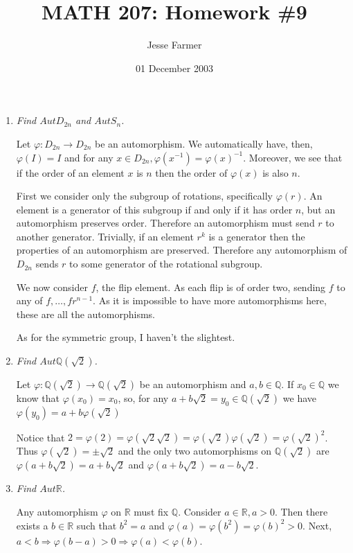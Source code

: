 \documentclass[10pt]{article}
\title{MATH 207: Homework \#9}
\author{Jesse Farmer}
\date{01 December 2003}
\begin{document}
\maketitle
\begin{enumerate}
\item \emph{Find $Aut D_{2n}$ and $Aut S_n$.}

Let $\varphi: D_{2n} \rightarrow D_{2n}$ be an automorphism.  We automatically have, then, $\varphi(I)=I$ and for any $x \in D_{2n},\varphi(x^{-1})=\varphi(x)^{-1}$.  Moreover, we see that if the order of an element $x$ is $n$ then the order of $\varphi(x)$ is also $n$.

First we consider only the subgroup of rotations, specifically $\varphi(r)$.  An element is a generator of this subgroup if and only if it has order $n$, but an automorphism preserves order.  Therefore an automorphism must send $r$ to another generator.  Trivially, if an element $r^k$ is a generator then the properties of an automorphism are preserved.  Therefore any automorphism of $D_{2n}$ sends $r$ to some generator of the rotational subgroup.

We now consider $f$, the flip element.  As each flip is of order two, sending $f$ to any of $f,\ldots,fr^{n-1}$.  As it is impossible to have more automorphisms here, these are all the automorphisms.

As for the symmetric group, I haven't the slightest.

\item \emph{Find $Aut{\mathbb{Q}(\sqrt{2})}$.}

Let $\varphi: \mathbb{Q}(\sqrt{2}) \rightarrow \mathbb{Q}(\sqrt{2})$ be an automorphism and $a,b \in \mathbb{Q}$.  If $x_0 \in \mathbb{Q}$ we know that $\varphi(x_0) = x_0$, so, for any $a + b\sqrt{2} = y_0 \in \mathbb{Q}(\sqrt{2})$ we have $\varphi(y_0) = a + b\varphi(\sqrt{2})$

Notice that $2 = \varphi(2) = \varphi(\sqrt{2}\sqrt{2}) = \varphi(\sqrt{2})\varphi(\sqrt{2}) = \varphi(\sqrt{2})^2$.  Thus $\varphi(\sqrt{2}) = \pm \sqrt{2}$ and the only two automorphisms on $\mathbb{Q}(\sqrt{2})$ are $\varphi(a+b\sqrt{2}) = a+b\sqrt{2}$ and $\varphi(a+b\sqrt{2}) = a-b\sqrt{2}$.
\item \emph{Find $Aut{\mathbb{R}}$.}

Any automorphism $\varphi$ on $\mathbb{R}$ must fix $\mathbb{Q}$.  Consider $a \in \mathbb{R}, a > 0$.  Then there exists a $b \in \mathbb{R}$ such that $b^2 = a$ and $\varphi(a) = \varphi(b^2) = \varphi(b)^2 > 0$.  Next, $a<b \Rightarrow \varphi(b-a)>0 \Rightarrow \varphi(a)<\varphi(b)$.


\end{enumerate}
\end{document}
